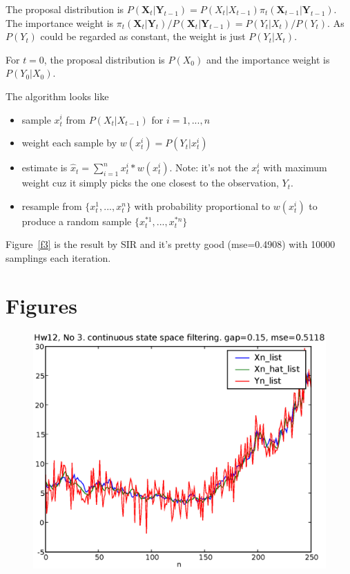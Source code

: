 \documentclass[a4paper,10pt]{article}
\begin{document}
The proposal distribution is $P(\mathbf{X}_t|\mathbf{Y}_{t-1}) = P(X_t|X_{t-1})\pi_t(\mathbf{X}_{t-1}|\mathbf{Y}_{t-1})$. The importance weight is $\pi_t(\mathbf{X}_t|\mathbf{Y}_t)/P(\mathbf{X}_t|\mathbf{Y}_{t-1}) = P(Y_t|X_t)/P(Y_t)$. As $P(Y_t)$ could be regarded as constant, the weight is just $P(Y_t|X_t)$.

For $t=0$, the proposal distribution is $P(X_0)$ and the importance weight is $P(Y_0|X_0)$.

The algorithm looks like
\begin{itemize}
\item sample $x_t^i$ from $P(X_t|X_{t-1})$ for $i=1,...,n$
\item weight each sample by $w(x_t^i) = P(Y_t|x_t^i)$
\item estimate is $\hat{x}_t = \sum_{i=1}^n x_t^i*w(x_t^i)$. Note: it's not the $x_t^i$ with maximum weight cuz it simply picks the one closest to the observation, $Y_t$.
\item resample from $\{x_t^1, ..., x_t^n\}$ with probability proportional to $w(x_t^i)$ to produce a random sample $\{x_t^{*1}, ..., x_t^{*n}\}$
\end{itemize}

Figure~\ref{f3} is the result by SIR and it's pretty good (mse=0.4908) with 10000 samplings each iteration.

\section{Figures}

\begin{figure}
\includegraphics[width=1\textwidth]{hw12_3_gap_0_15.eps}
\caption{}\label{f1}
\end{figure}
\end{document}
